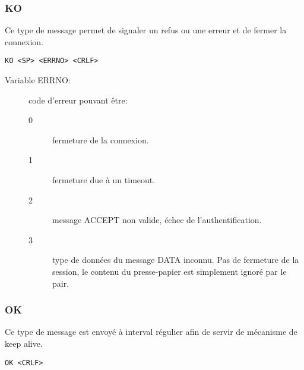 \hrulefill

\subsubsection*{KO}
Ce type de message permet de signaler un refus ou une erreur et de fermer
la connexion.
\begin{verbatim}
KO <SP> <ERRNO> <CRLF>
\end{verbatim}
\begin{description}
\item[Variable ERRNO:] code d'erreur pouvant être:
  \begin{description}
  \item[0] fermeture de la connexion.
  \item[1] fermeture due à un timeout.
  \item[2] message ACCEPT non valide, échec de l'authentification.
  \item[3] type de données du message DATA inconnu. Pas de fermeture de la
    session, le contenu du presse-papier est simplement ignoré par le pair.
  \end{description}
\end{description}

\hrulefill

\subsubsection*{OK}
Ce type de message est envoyé à interval régulier afin de servir de mécanisme
de keep alive.
\begin{verbatim}
OK <CRLF>
\end{verbatim}

\hrulefill

